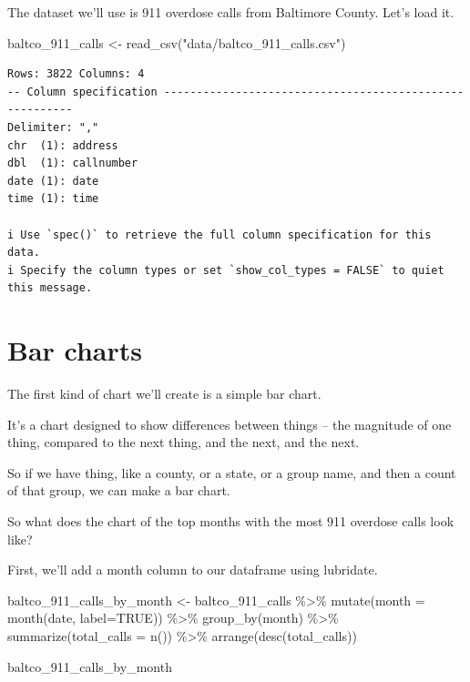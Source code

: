 \documentclass[
  letterpaper,
  DIV=11,
  numbers=noendperiod]{scrreprt}
\newenvironment{Shaded}{\begin{snugshade}}{\end{snugshade}}
\newcommand{\AttributeTok}[1]{\textcolor[rgb]{0.40,0.45,0.13}{#1}}
\newcommand{\ConstantTok}[1]{\textcolor[rgb]{0.56,0.35,0.01}{#1}}
\newcommand{\FunctionTok}[1]{\textcolor[rgb]{0.28,0.35,0.67}{#1}}
\newcommand{\NormalTok}[1]{\textcolor[rgb]{0.00,0.23,0.31}{#1}}
\newcommand{\OtherTok}[1]{\textcolor[rgb]{0.00,0.23,0.31}{#1}}
\newcommand{\SpecialCharTok}[1]{\textcolor[rgb]{0.37,0.37,0.37}{#1}}
\newcommand{\StringTok}[1]{\textcolor[rgb]{0.13,0.47,0.30}{#1}}
\begin{document}
The dataset we'll use is 911 overdose calls from Baltimore County. Let's
load it.

\begin{Shaded}
\begin{Highlighting}[]
\NormalTok{baltco\_911\_calls }\OtherTok{\textless{}{-}} \FunctionTok{read\_csv}\NormalTok{(}\StringTok{"data/baltco\_911\_calls.csv"}\NormalTok{)}
\end{Highlighting}
\end{Shaded}

\begin{verbatim}
Rows: 3822 Columns: 4
-- Column specification --------------------------------------------------------
Delimiter: ","
chr  (1): address
dbl  (1): callnumber
date (1): date
time (1): time

i Use `spec()` to retrieve the full column specification for this data.
i Specify the column types or set `show_col_types = FALSE` to quiet this message.
\end{verbatim}

\hypertarget{bar-charts}{%
\section{Bar charts}\label{bar-charts}}

The first kind of chart we'll create is a simple bar chart.

It's a chart designed to show differences between things -- the
magnitude of one thing, compared to the next thing, and the next, and
the next.

So if we have thing, like a county, or a state, or a group name, and
then a count of that group, we can make a bar chart.

So what does the chart of the top months with the most 911 overdose
calls look like?

First, we'll add a month column to our dataframe using lubridate.

\begin{Shaded}
\begin{Highlighting}[]
\NormalTok{baltco\_911\_calls\_by\_month }\OtherTok{\textless{}{-}}\NormalTok{ baltco\_911\_calls }\SpecialCharTok{\%\textgreater{}\%}
  \FunctionTok{mutate}\NormalTok{(}\AttributeTok{month =} \FunctionTok{month}\NormalTok{(date, }\AttributeTok{label=}\ConstantTok{TRUE}\NormalTok{)) }\SpecialCharTok{\%\textgreater{}\%} 
  \FunctionTok{group\_by}\NormalTok{(month) }\SpecialCharTok{\%\textgreater{}\%} 
  \FunctionTok{summarize}\NormalTok{(}\AttributeTok{total\_calls =} \FunctionTok{n}\NormalTok{()) }\SpecialCharTok{\%\textgreater{}\%} 
  \FunctionTok{arrange}\NormalTok{(}\FunctionTok{desc}\NormalTok{(total\_calls))}

\NormalTok{baltco\_911\_calls\_by\_month}
\end{Highlighting}
\end{Shaded}
\end{document}
